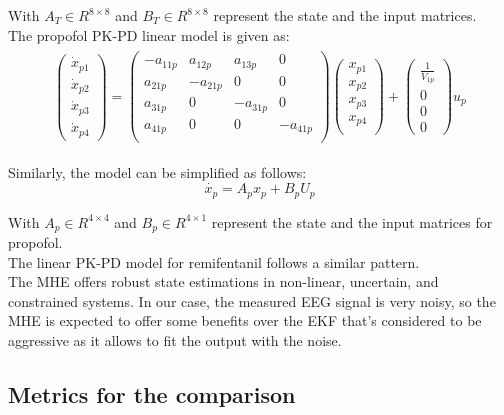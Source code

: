 \noindent With $A_T \in R^{8\times8}$ and $B_T \in R^{8\times8}$ represent the state and the input matrices.\\

\noindent The propofol PK-PD linear model is given as:
\begin{align*}
\begin{split}
\begin{pmatrix}\dot{x}_{p1}\\ \dot{x}_{p2}\\ \dot{x}_{p3}\\ \dot{x}_{p4}\end{pmatrix} = 
\begin{pmatrix}
    -a_{11p} & a_{12p} & a_{13p} & 0 \\
     a_{21p} & -a_{21p} & 0 & 0 \\  
     a_{31p} & 0 & -a_{31p} & 0 \\
     a_{41p} & 0 & 0 & -a_{41p} \\
\end{pmatrix}
\begin{pmatrix} x_{p1}\\ x_{p2}\\ x_{p3}\\ x_{p4}\\ \end{pmatrix} +
\begin{pmatrix} \frac{1}{V_{1p}}\\ 0\\ 0\\ 0 \end{pmatrix}u_p
\end{split}
\end{align*}

\noindent Similarly, the model can be simplified as follows:
\begin{equation*}
\dot{x_p}=A_px_p+B_pU_p
\end{equation*}

\noindent With $A_p \in R^{4\times4}$ and $B_p \in R^{4\times1}$ represent the state and the input matrices for propofol.\\

\noindent The linear PK-PD model for remifentanil follows a similar pattern.\\

The MHE offers robust state estimations in non-linear, uncertain, and constrained systems. In our case, the measured EEG signal is very noisy, so the MHE is expected to offer some benefits over the EKF that’s considered to be aggressive as it allows to fit the output with the noise.

\subsection{Metrics for the comparison}